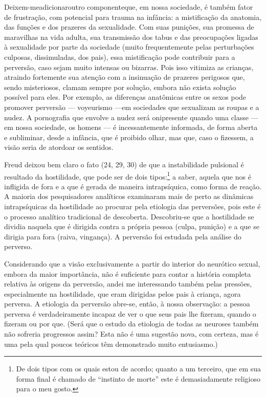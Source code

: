 Deixem-me\idxpervmiste[|(] adicionar\idxmist[|(] outro componente\idxsexuamis[|(] que, em nossa sociedade, é
também fator de frustração, com potencial para trauma na infância: a
mistificação da anatomia, das funções e dos prazeres da sexualidade.
Com suas punições, sua promessa de maravilhas na vida adulta, sua
transmissão dos tabus e das preocupações ligadas à sexualidade por
parte da sociedade (muito frequentemente pelas perturbações culposas,
dissimuladas, dos pais), essa mistificação pode contribuir para a
perversão, caso sejam muito intensas ou bizarras. Pois isso vitimiza as
crianças, atraindo fortemente sua atenção com a insinuação de prazeres
perigosos que, sendo misteriosos, clamam sempre por solução, embora não
exista solução possível para eles. Por exemplo, as diferenças
anatômicas entre os sexos pode promover perversão --- voyeurismo ---\idxvoy[|(]
em sociedades que sexualizam as roupas\idxroup{} e a nudez. A pornografia que
envolve a nudez será onipresente quando uma classe --- em nossa
sociedade, os homens --- é incessantemente informada, de forma aberta
e subliminar, desde a infância, que é proibido olhar, mas que, caso o
fizessem, a visão seria de atordoar os sentidos.

Freud\idxfreudinsti{} deixou bem claro o fato (24, 29, 30) de que a instabilidade
pulsional é resultado da hostilidade, que pode ser de dois
tipos:\footnote{ De dois tipos com os quais estou de acordo; quanto a um
terceiro, que em sua forma final é chamado de ``instinto
de morte'' este é demasiadamente religioso para o meu
gosto.} a saber, aquela que nos é infligida de fora e
a que é gerada de maneira intrapsíquica, como forma de reação. A
maioria dos pesquisadores analíticos examinaram mais de perto as
dinâmicas intrapsíquicas da hostilidade ao procurar pela etiologia das
perversões, pois este é o processo analítico tradicional de descoberta.
Descobriu-se que a hostilidade se dividia naquela que é dirigida contra
a própria pessoa\idxhostculp{} (culpa,\idxculpah{} punição) e a que se dirigia para fora (raiva,
vingança). A perversão foi estudada pela análise do perverso.

Considerando que a visão exclusivamente a partir do interior do
neurótico sexual, embora da maior importância, não é suficiente para
contar a história completa relativa às origens da perversão, andei me
interessando também pelas pressões, especialmente na hostilidade, que
eram dirigidas pelos pais à criança,\idxhostrela{} agora perversa. A etiologia da
perversão abre-se, então, à nossa observação: a pessoa perversa é
verdadeiramente incapaz de ver o que seus pais lhe fizeram, quando o
fizeram ou por que. (Será que o estudo da etiologia de todas as
neuroses também não sofreria progressos assim? Esta não é uma sugestão
nova, com certeza, mas é uma pela qual poucos teóricos têm demonstrado
muito entusiasmo.)

